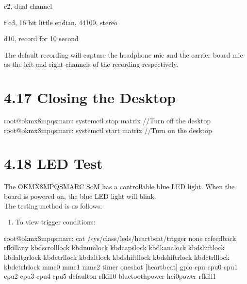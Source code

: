 \documentclass[letterpaper,10pt,openany,english]{sphinxmanual}
\begin{document}
\sphinxAtStartPar
\sphinxhyphen{}c2, dual channel

\sphinxAtStartPar
\sphinxhyphen{}f cd, 16 bit little endian, 44100, stereo

\sphinxAtStartPar
\sphinxhyphen{}d10, record for 10 second

\sphinxAtStartPar
The default recording will capture the headphone mic and the carrier board mic as the left and right channels of the recording respectively.


\section{4.17 Closing the Desktop}
\label{\detokenize{linux-manual:closing-the-desktop}}
\begin{sphinxVerbatim}[commandchars=\\\{\}]
root@ok\PYGZhy{}mx8mpq\PYGZhy{}smarc:\PYGZti{}\PYGZsh{} systemctl stop matrix                      //Turn off the desktop
root@ok\PYGZhy{}mx8mpq\PYGZhy{}smarc:\PYGZti{}\PYGZsh{} systemctl start matrix                      //Turn on the desktop
\end{sphinxVerbatim}


\section{4.18 LED Test}
\label{\detokenize{linux-manual:led-test}}
\sphinxAtStartPar
The OK\sphinxhyphen{}MX8MPQ\sphinxhyphen{}SMARC SoM has a controllable blue LED light. When the board is powered on, the blue LED light will blink.\\
The testing method is as follows:
\begin{enumerate}
%
\item {} 
\sphinxAtStartPar
To view trigger conditions:

\end{enumerate}

\begin{sphinxVerbatim}[commandchars=\\\{\}]
root@ok\PYGZhy{}mx8mpq\PYGZhy{}smarc:\PYGZti{}\PYGZsh{} cat /sys/class/leds/heartbeat/trigger
none rc\PYGZhy{}feedback rfkill\PYGZhy{}any kbd\PYGZhy{}scrolllock kbd\PYGZhy{}numlock kbd\PYGZhy{}capslock kbd\PYGZhy{}kanalock kbd\PYGZhy{}shiftlock kbd\PYGZhy{}altgrlock kbd\PYGZhy{}ctrllock kbd\PYGZhy{}altlock kbd\PYGZhy{}shiftllock kbd\PYGZhy{}shiftrlock kbd\PYGZhy{}ctrlllock kbd\PYGZhy{}ctrlrlock mmc0 mmc1 mmc2 timer oneshot [heartbeat] gpio cpu cpu0 cpu1 cpu2 cpu3 cpu4 cpu5 default\PYGZhy{}on rfkill0 bluetooth\PYGZhy{}power hci0\PYGZhy{}power rfkill1
\end{sphinxVerbatim}
\end{document}

